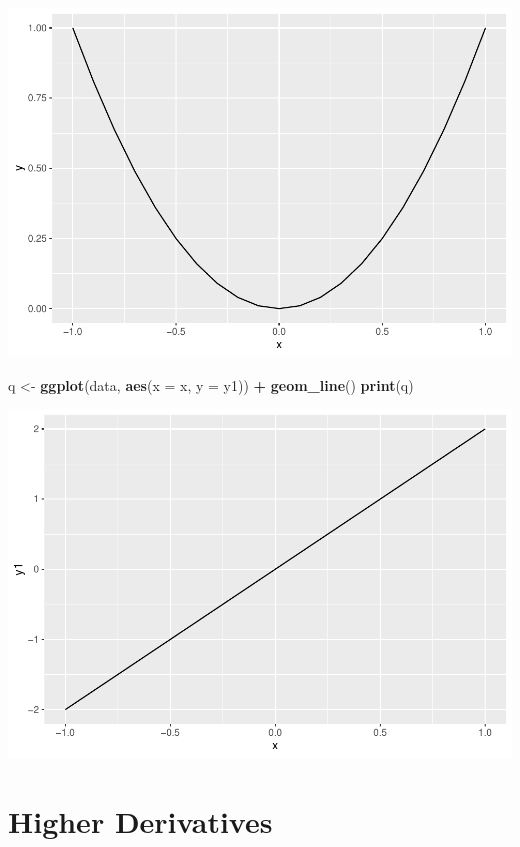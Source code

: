 \documentclass[
]{book}
\newenvironment{Shaded}{\begin{snugshade}}{\end{snugshade}}
\newcommand{\AttributeTok}[1]{\textcolor[rgb]{0.13,0.29,0.53}{#1}}
\newcommand{\FunctionTok}[1]{\textcolor[rgb]{0.13,0.29,0.53}{\textbf{#1}}}
\newcommand{\NormalTok}[1]{#1}
\newcommand{\OtherTok}[1]{\textcolor[rgb]{0.56,0.35,0.01}{#1}}
\newcommand{\SpecialCharTok}[1]{\textcolor[rgb]{0.81,0.36,0.00}{\textbf{#1}}}
\begin{document}
\includegraphics{bookdown-demo_files/figure-latex/unnamed-chunk-7-1.pdf}

\begin{Shaded}
\begin{Highlighting}[]
\NormalTok{q }\OtherTok{\textless{}{-}} \FunctionTok{ggplot}\NormalTok{(data, }\FunctionTok{aes}\NormalTok{(}\AttributeTok{x =}\NormalTok{ x, }\AttributeTok{y =}\NormalTok{ y1)) }\SpecialCharTok{+}
  \FunctionTok{geom\_line}\NormalTok{()}
\FunctionTok{print}\NormalTok{(q)}
\end{Highlighting}
\end{Shaded}

\includegraphics{bookdown-demo_files/figure-latex/unnamed-chunk-8-1.pdf}

\hypertarget{higher-derivatives}{%
\section{Higher Derivatives}\label{higher-derivatives}}
\end{document}
